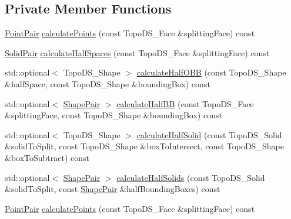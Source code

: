 \subsection*{Private Member Functions}
\begin{DoxyCompactItemize}
\item 
\hyperlink{classMcCAD_1_1Decomposition_1_1SolidSplitter_af1bd2cdc22fc3e59277ea6fd04afc42b}{Point\+Pair} \hyperlink{classMcCAD_1_1Decomposition_1_1SolidSplitter_ab9be5e10e5544c26055144c72de0e499}{calculate\+Points} (const Topo\+D\+S\+\_\+\+Face \&splitting\+Face) const
\item 
\hyperlink{classMcCAD_1_1Decomposition_1_1SolidSplitter_a89a95e43f161348b456a72c9acce0826}{Solid\+Pair} \hyperlink{classMcCAD_1_1Decomposition_1_1SolidSplitter_a30fbfd5f3829a840d6cbe4d50f71fa00}{calculate\+Half\+Spaces} (const Topo\+D\+S\+\_\+\+Face \&splitting\+Face) const
\item 
std\+::optional$<$ Topo\+D\+S\+\_\+\+Shape $>$ \hyperlink{classMcCAD_1_1Decomposition_1_1SolidSplitter_aed5d786662443c45343c480b00c6f6e8}{calculate\+Half\+O\+BB} (const Topo\+D\+S\+\_\+\+Shape \&half\+Space, const Topo\+D\+S\+\_\+\+Shape \&bounding\+Box) const
\item 
std\+::optional$<$ \hyperlink{classMcCAD_1_1Decomposition_1_1SolidSplitter_a6d92618f3790cfc7403c6f421bd66411}{Shape\+Pair} $>$ \hyperlink{classMcCAD_1_1Decomposition_1_1SolidSplitter_a39e64be00e1eb2c6d2149c2b7d6cc85b}{calculate\+Half\+BB} (const Topo\+D\+S\+\_\+\+Face \&splitting\+Face, const Topo\+D\+S\+\_\+\+Shape \&bounding\+Box) const
\item 
std\+::optional$<$ Topo\+D\+S\+\_\+\+Shape $>$ \hyperlink{classMcCAD_1_1Decomposition_1_1SolidSplitter_aa2399efe97e9013c846b4c41907c9339}{calculate\+Half\+Solid} (const Topo\+D\+S\+\_\+\+Solid \&solid\+To\+Split, const Topo\+D\+S\+\_\+\+Shape \&box\+To\+Intersect, const Topo\+D\+S\+\_\+\+Shape \&box\+To\+Subtract) const
\item 
std\+::optional$<$ \hyperlink{classMcCAD_1_1Decomposition_1_1SolidSplitter_a6d92618f3790cfc7403c6f421bd66411}{Shape\+Pair} $>$ \hyperlink{classMcCAD_1_1Decomposition_1_1SolidSplitter_a96441384cc19440a4884adca0bc26be3}{calculate\+Half\+Solids} (const Topo\+D\+S\+\_\+\+Solid \&solid\+To\+Split, const \hyperlink{classMcCAD_1_1Decomposition_1_1SolidSplitter_a6d92618f3790cfc7403c6f421bd66411}{Shape\+Pair} \&half\+Bounding\+Boxes) const
\item 
\hyperlink{classMcCAD_1_1Decomposition_1_1SolidSplitter_af1bd2cdc22fc3e59277ea6fd04afc42b}{Point\+Pair} \hyperlink{classMcCAD_1_1Decomposition_1_1SolidSplitter_a5d2f4d3aab2322de064fd5e1e0dc5a1e}{calculate\+Points} (const Topo\+D\+S\+\_\+\+Face \&splitting\+Face) const

\end{DoxyCompactItemize}
